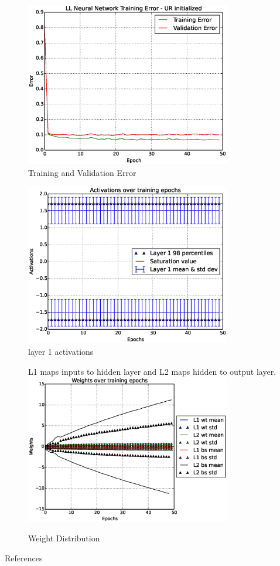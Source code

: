 \documentclass[Proceedings]{ascelike}
\begin{document}
\begin{figure}[H]
    \caption{Training and Validation Error}
    \label{fig:ll_test_err}
    \centering
    \includegraphics[width=0.8\textwidth,keepaspectratio]{ll_perf.eps}
\end{figure}

\begin{figure}[H]
    \caption{layer 1 activations}
    \label{fig:ll_actv_dist}
    \centering
    \includegraphics[width=0.8\textwidth,keepaspectratio]{ll_actv.eps}
\end{figure}

\begin{figure}[H]
    \caption{Weight Distribution}
    \medskip
    \small
    L1 maps inputs to hidden layer and L2 maps hidden to output layer. 
    \label{fig:ll_50ep_train_err}
    \centering
    \includegraphics[width=0.8\textwidth,keepaspectratio]{ll_weights_50ep.eps}
\end{figure}

{References}

\end{document}
